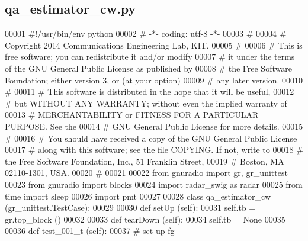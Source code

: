\subsection{qa\+\_\+estimator\+\_\+cw.\+py}
\label{qa__estimator__cw_8py_source}

\begin{DoxyCode}
00001 \textcolor{comment}{#!/usr/bin/env python}
00002 \textcolor{comment}{# -*- coding: utf-8 -*-}
00003 \textcolor{comment}{# }
00004 \textcolor{comment}{# Copyright 2014 Communications Engineering Lab, KIT.}
00005 \textcolor{comment}{# }
00006 \textcolor{comment}{# This is free software; you can redistribute it and/or modify}
00007 \textcolor{comment}{# it under the terms of the GNU General Public License as published by}
00008 \textcolor{comment}{# the Free Software Foundation; either version 3, or (at your option)}
00009 \textcolor{comment}{# any later version.}
00010 \textcolor{comment}{# }
00011 \textcolor{comment}{# This software is distributed in the hope that it will be useful,}
00012 \textcolor{comment}{# but WITHOUT ANY WARRANTY; without even the implied warranty of}
00013 \textcolor{comment}{# MERCHANTABILITY or FITNESS FOR A PARTICULAR PURPOSE.  See the}
00014 \textcolor{comment}{# GNU General Public License for more details.}
00015 \textcolor{comment}{# }
00016 \textcolor{comment}{# You should have received a copy of the GNU General Public License}
00017 \textcolor{comment}{# along with this software; see the file COPYING.  If not, write to}
00018 \textcolor{comment}{# the Free Software Foundation, Inc., 51 Franklin Street,}
00019 \textcolor{comment}{# Boston, MA 02110-1301, USA.}
00020 \textcolor{comment}{# }
00021 
00022 \textcolor{keyword}{from} gnuradio \textcolor{keyword}{import} gr, gr\_unittest
00023 \textcolor{keyword}{from} gnuradio \textcolor{keyword}{import} blocks
00024 \textcolor{keyword}{import} radar\_swig \textcolor{keyword}{as} radar
00025 \textcolor{keyword}{from} time \textcolor{keyword}{import} sleep
00026 \textcolor{keyword}{import} pmt
00027 
00028 \textcolor{keyword}{class }qa_estimator_cw (gr\_unittest.TestCase):
00029 
00030     \textcolor{keyword}{def }setUp (self):
00031         self.tb = gr.top\_block ()
00032 
00033     \textcolor{keyword}{def }tearDown (self):
00034         self.tb = \textcolor{keywordtype}{None}
00035 
00036     \textcolor{keyword}{def }test_001_t (self):
00037         \textcolor{comment}{# set up fg}

\end{DoxyCode}
